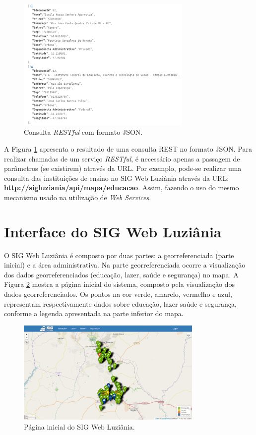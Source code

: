 \begin{figure}[h]
\centering
\includegraphics[width=0.75\textwidth]{./img/cap_IV/4-ConsultaJSON}
\caption{Consulta \textit{RESTful} com formato JSON.}
\label{fig:ConsultaJSON}
\end{figure}

A Figura \ref{fig:ConsultaJSON} apresenta o resultado de uma consulta REST no formato JSON. Para realizar chamadas de um serviço \textit{RESTful}, é necessário apenas a passagem de parâmetros (se existirem) através da URL. Por exemplo, pode-se realizar uma consulta das instituições de ensino no SIG Web Luziânia através da URL: \textbf{http://sigluziania/api/mapa/educacao}. Assim, fazendo o uso do mesmo mecanismo usado na utilização de \textit{Web Services}.

\newpage

\section{Interface do SIG Web Luziânia}

O SIG Web Luziânia é composto por duas partes: a georreferenciada (parte inicial) e a área administrativa. Na parte georreferenciada ocorre a visualização dos dados georreferenciados (educação, lazer, saúde e segurança) no mapa. A Figura \ref{fig:PaginaInicial} mostra a página inicial do sistema, composto pela visualização dos dados georreferenciados. Os pontos na cor verde, amarelo, vermelho e azul, representam respectivamente dados sobre educação, lazer saúde e segurança, conforme a legenda apresentada na parte inferior do mapa.

\begin{figure}[h]
\centering
\includegraphics[width=0.80\textwidth]{./img/cap_IV/5-PaginaInicial}
\caption{Página inicial do SIG Web Luziânia.}
\label{fig:PaginaInicial}
\end{figure}

